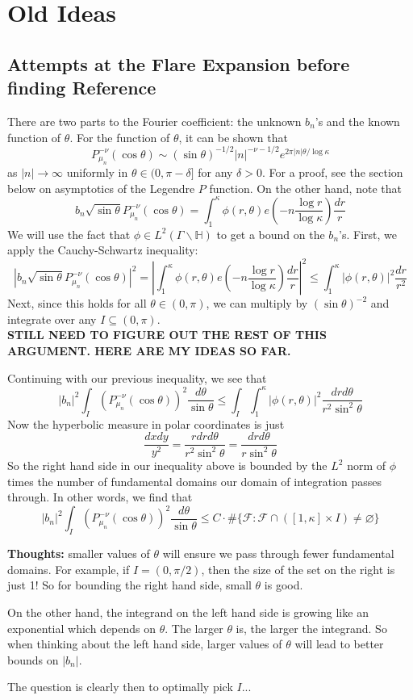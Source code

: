 \documentclass[]{article}
\begin{document}
\section*{Old Ideas}

\subsection*{Attempts at the Flare Expansion before finding Reference}

There are two parts to the Fourier coefficient: the unknown $b_n$'s and the known function of $\theta$.
For the function of $\theta$, it can be shown that
$$
P_{\mu_n}^{-\nu}(\cos\theta) \sim (\sin\theta)^{-1/2}|n|^{-\nu-1/2}e^{2\pi|n|\theta/\log\kappa}
$$
as $|n| \rightarrow \infty$ uniformly in $\theta \in (0, \pi-\delta]$ for any $\delta > 0$.
For a proof, see the section below on asymptotics of the Legendre $P$ function.
On the other hand, note that
$$
b_n\sqrt{\sin\theta}P_{\mu_n}^{-\nu}(\cos\theta) =
\int_{1}^{\kappa}\phi(r, \theta)e\left(-n\frac{\log r}{\log\kappa}\right)\frac{dr}{r}
$$
We will use the fact that $\phi \in L^2(\Gamma\backslash\mathbb{H})$ to get a bound on the $b_n$'s.
First, we apply the Cauchy-Schwartz inequality:
$$
|b_n\sqrt{\sin\theta}P_{\mu_n}^{-\nu}(\cos\theta)|^2 =
\left|\int_{1}^{\kappa}\phi(r, \theta)e\left(-n\frac{\log r}{\log\kappa}\right)\frac{dr}{r}\right|^2 \leq
\int_{1}^{\kappa}|\phi(r, \theta)|^2\frac{dr}{r^2}
$$
Next, since this holds for all $\theta \in (0, \pi)$, we can multiply by $(\sin\theta)^{-2}$ and integrate over any $I \subseteq (0, \pi)$.
\\

\textbf{STILL NEED TO FIGURE OUT THE REST OF THIS ARGUMENT. HERE ARE MY IDEAS SO FAR.}

Continuing with our previous inequality, we see that
$$
|b_n|^2\int_I \left( P_{\mu_n}^{-\nu}(\cos\theta) \right)^2\frac{d\theta}{\sin\theta} \leq
\int_I\int_{1}^{\kappa}|\phi(r, \theta)|^2\frac{drd\theta}{r^2\sin^2\theta}
$$
Now the hyperbolic measure in polar coordinates is just
$$
\frac{dxdy}{y^2} = \frac{rdrd\theta}{r^2\sin^2\theta} = \frac{drd\theta}{r\sin^2\theta}
$$
So the right hand side in our inequality above is bounded by the $L^2$ norm of $\phi$ times the number of fundamental domains our domain of integration passes through.
In other words, we find that
$$
|b_n|^2\int_I \left( P_{\mu_n}^{-\nu}(\cos\theta) \right)^2\frac{d\theta}{\sin\theta} \leq
C\cdot\#\{ \mathcal{F} : \mathcal{F} \cap ([1, \kappa]\times I) \neq \varnothing \}
$$

\textbf{Thoughts:} smaller values of $\theta$ will ensure we pass through fewer fundamental domains.
For example, if $I = (0, \pi/2)$, then the size of the set on the right is just 1!
So for bounding the right hand side, small $\theta$ is good.

On the other hand, the integrand on the left hand side is growing like an exponential which depends on $\theta$.
The larger $\theta$ is, the larger the integrand.
So when thinking about the left hand side, larger values of $\theta$ will lead to better bounds on $|b_n|$.

The question is clearly then to optimally pick $I$...
	
\end{document}
